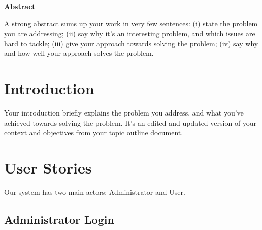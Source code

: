 \documentclass{scrartcl}
\renewenvironment{abstract}{
    \begin{center}
    {\Large \textbf{Abstract}}
    \vspace{0.5cm}
    \par\itshape
    \begin{minipage}{0.8\linewidth}}{\end{minipage}
    \noindent\ignorespaces
    \end{center}
}
\begin{document}
\begin{abstract}
  A strong abstract sums up your work in very few sentences:
  (i) state the problem you are addressing;
  (ii) say why it’s an interesting problem, and which issues are hard to tackle;
  (iii) give your approach towards solving the problem;
  (iv) say why and how well your approach solves the problem.
\end{abstract}\vspace{1cm}

\newpage

\tableofcontents

\newpage

\section{Introduction}

Your introduction briefly explains the problem you address, and what you've achieved towards solving the problem. It's an edited and updated version of your context and objectives from your topic outline document.

\section{User Stories}

Our system has two main actors: Administrator and User.

\subsection{Administrator Login}
\end{document}
